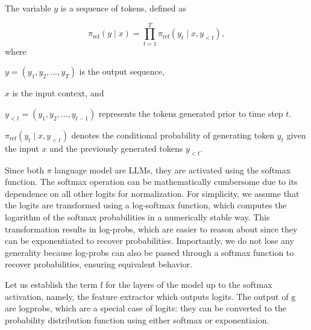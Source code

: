 \documentclass[twoside,11pt]{article}
\begin{document}
The variable $y$ is a sequence of tokens, defined as

\begin{equation}
  \label{eq:joint}
  \pi_\mathrm{ref}(y \mid x) = \prod_{t=1}^T \pi_\mathrm{ref}(y_t \mid x, y_{<t}),
\end{equation}
where 
\begin{description}
\item \(y = (y_1, y_2, \ldots, y_T)\) is the output sequence,
\item \(x\) is the input context, and
\item \(y_{<t} = (y_1, y_2, \ldots, y_{t-1})\) represents the tokens 
  generated prior to time step \(t\). 
\item 
\(\pi_\mathrm{ref}(y_t \mid x, y_{<t})\) denotes the conditional 
probability of generating token \(y_t\) given the input \(x\) and 
the previously generated tokens \(y_{<t}\).
\end{description}

Since both $\pi$ language model are LLMs, they are activated
using the softmax function. 
The softmax operation can be mathematically cumbersome 
due to its dependence on all other logits for normalization. 
For simplicity, we assume that the logits are transformed 
using a log-softmax function, which computes the logarithm 
of the softmax probabilities in a numerically stable way. 
This transformation results in log-probs, 
which are easier to reason about since they 
can be exponentiated to recover probabilities. 
Importantly, we do not lose any generality because 
log-probs can also be passed through a softmax 
function to recover probabilities, ensuring equivalent behavior.

Let us establish the term $\mathrm{f}$ for the layers of the model up to the softmax
activation, namely, the feature extractor which outputs logits. The output of 
$\mathrm{g}$ are logprobs, which are a special case of logits: they
can be converted to the probability distribution function using 
either softmax or exponentiaion. 
\end{document}
